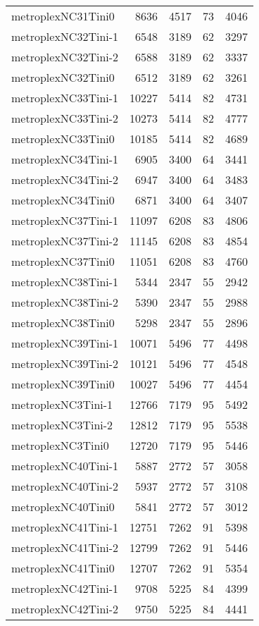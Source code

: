 \begin{longtable}{lrrrr}
metroplexNC31Tini0 & 8636 & 4517 & 73 & 4046 \\
metroplexNC32Tini-1 & 6548 & 3189 & 62 & 3297 \\
metroplexNC32Tini-2 & 6588 & 3189 & 62 & 3337 \\
metroplexNC32Tini0 & 6512 & 3189 & 62 & 3261 \\
metroplexNC33Tini-1 & 10227 & 5414 & 82 & 4731 \\
metroplexNC33Tini-2 & 10273 & 5414 & 82 & 4777 \\
metroplexNC33Tini0 & 10185 & 5414 & 82 & 4689 \\
metroplexNC34Tini-1 & 6905 & 3400 & 64 & 3441 \\
metroplexNC34Tini-2 & 6947 & 3400 & 64 & 3483 \\
metroplexNC34Tini0 & 6871 & 3400 & 64 & 3407 \\
metroplexNC37Tini-1 & 11097 & 6208 & 83 & 4806 \\
metroplexNC37Tini-2 & 11145 & 6208 & 83 & 4854 \\
metroplexNC37Tini0 & 11051 & 6208 & 83 & 4760 \\
metroplexNC38Tini-1 & 5344 & 2347 & 55 & 2942 \\
metroplexNC38Tini-2 & 5390 & 2347 & 55 & 2988 \\
metroplexNC38Tini0 & 5298 & 2347 & 55 & 2896 \\
metroplexNC39Tini-1 & 10071 & 5496 & 77 & 4498 \\
metroplexNC39Tini-2 & 10121 & 5496 & 77 & 4548 \\
metroplexNC39Tini0 & 10027 & 5496 & 77 & 4454 \\
metroplexNC3Tini-1 & 12766 & 7179 & 95 & 5492 \\
metroplexNC3Tini-2 & 12812 & 7179 & 95 & 5538 \\
metroplexNC3Tini0 & 12720 & 7179 & 95 & 5446 \\
metroplexNC40Tini-1 & 5887 & 2772 & 57 & 3058 \\
metroplexNC40Tini-2 & 5937 & 2772 & 57 & 3108 \\
metroplexNC40Tini0 & 5841 & 2772 & 57 & 3012 \\
metroplexNC41Tini-1 & 12751 & 7262 & 91 & 5398 \\
metroplexNC41Tini-2 & 12799 & 7262 & 91 & 5446 \\
metroplexNC41Tini0 & 12707 & 7262 & 91 & 5354 \\
metroplexNC42Tini-1 & 9708 & 5225 & 84 & 4399 \\
metroplexNC42Tini-2 & 9750 & 5225 & 84 & 4441 \\

\end{longtable}
